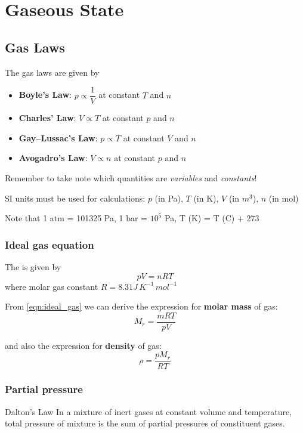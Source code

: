 \section{Gaseous State}
\subsection{Gas Laws}
The gas laws are given by
\begin{itemize}
\item \textbf{Boyle's Law}: $p \propto \dfrac{1}{V}$ at constant $T$ and $n$
\item \textbf{Charles' Law}: $V \propto T$ at constant $p$ and $n$
\item \textbf{Gay--Lussac's Law}: $p \propto T$ at constant $V$ and $n$
\item \textbf{Avogadro's Law}: $V \propto n$ at constant $p$ and $n$
\end{itemize}

\begin{remark}
Remember to take note which quantities are \emph{variables} and \emph{constants}!
\end{remark}

\begin{remark}
SI units must be used for calculations: $p$ (in Pa), $T$ (in K), $V$ (in $\unit{m^3}$), $n$ (in mol)

Note that 1 atm = 101325 Pa, 1 bar = $10^5$ Pa, T (K) = T (\degree C) + 273
\end{remark}

\subsubsection{Ideal gas equation}
The  is given by
\begin{equation}\label{eqn:ideal_gas}
pV = nRT
\end{equation}
where molar gas constant $R = 8.31 \unit{J\,K^{-1}\,mol^{-1}}$

From \cref{eqn:ideal_gas} we can derive the expression for \textbf{molar mass} of gas:
\begin{equation}
M_r = \frac{mRT}{pV}
\end{equation}

and also the expression for \textbf{density} of gas:
\begin{equation}
\rho = \frac{pM_r}{RT}
\end{equation}

\subsubsection{Partial pressure}
\begin{defn}{Dalton's Law}{}
In a mixture of inert gases at constant volume and temperature, total pressure of mixture is the sum of partial pressures of constituent gases.
\end{defn}

